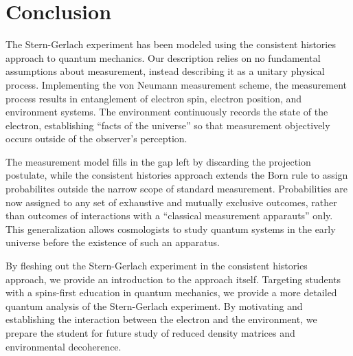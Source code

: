 \chapter{Conclusion}
The Stern-Gerlach experiment has been modeled using the consistent histories approach to quantum mechanics. Our description relies on no fundamental assumptions about measurement, instead describing it as a unitary physical process. Implementing the von Neumann measurement scheme, the measurement process results in entanglement of electron spin, electron position, and environment systems. The environment continuously records the state of the electron, establishing ``facts of the universe'' so that measurement objectively occurs outside of the observer's perception.

The measurement model fills in the gap left by discarding the projection postulate, while the consistent histories approach extends the Born rule to assign probabilites outside the narrow scope of standard measurement. Probabilities are now assigned to any set of exhaustive and mutually exclusive outcomes, rather than outcomes of interactions with a ``classical measurement apparauts'' only. This generalization allows cosmologists to study quantum systems in the early universe before the existence of such an apparatus.

By fleshing out the Stern-Gerlach experiment in the consistent histories approach, we provide an introduction to the approach itself. Targeting students with a spins-first education in quantum mechanics, we provide a more detailed quantum analysis of the Stern-Gerlach experiment. By motivating and establishing the interaction between the electron and the environment, we prepare the student for future study of reduced density matrices and environmental decoherence.

{}






